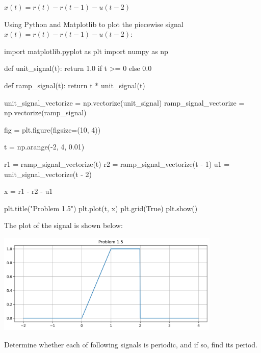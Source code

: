 \documentclass[a4paper, 10pt]{article}
\begin{document}
\begin{tosubmit}
\begin{subproblems}[start=5]
    \item \( x(t) = r(t) - r(t - 1) - u(t - 2) \)
\end{subproblems}

\par\noindent\submitsolution
Using Python and Matplotlib to plot the piecewise signal \( x(t) = r(t) - r(t - 1) - u(t - 2) \):
\begin{codingbox}
import matplotlib.pyplot as plt
import numpy as np

def unit_signal(t):
    return 1.0 if t >= 0 else 0.0

def ramp_signal(t):
    return t * unit_signal(t)

unit_signal_vectorize = np.vectorize(unit_signal)
ramp_signal_vectorize = np.vectorize(ramp_signal)

fig = plt.figure(figsize=(10, 4))

t = np.arange(-2, 4, 0.01)

r1 = ramp_signal_vectorize(t)
r2 = ramp_signal_vectorize(t - 1)
u1 = unit_signal_vectorize(t - 2)

x = r1 - r2 - u1

plt.title("Problem 1.5")
plt.plot(t, x)
plt.grid(True)
plt.show()
\end{codingbox}

The plot of the signal is shown below:
\begin{center}
    \includegraphics[width=0.8\textwidth]{images/problem_1_5.png}
\end{center}
\end{tosubmit}


\newpage

\begin{problem}
Determine whether each of following signals is periodic, and if so, find its period.
\end{problem}
\end{document}
